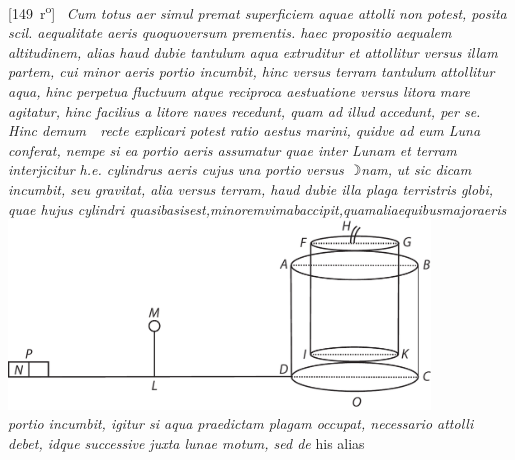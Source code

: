 [149~r\textsuperscript{o}]
\pend%
\count{}
\count{}
\pstart%
% 
%
%
% 
 \,
\textit{Cum totus aer simul premat superficiem aquae attolli non potest, posita scil. aequalitate aeris quoquoversum prementis.
haec propositio aequalem
altitudinem, alias
\textit{haud dubie tantulum aqua extruditur et attollitur versus illam partem, cui minor aeris portio incumbit, hinc versus terram tantulum}} \textit{attollitur aqua, hinc perpetua fluctuum atque reciproca aestuatione versus litora} \textit{mare agitatur, hinc facilius a litore naves recedunt, quam ad illud accedunt, per se.} \textit{Hinc demum\ }\ \textit{recte explicari potest ratio aestus marini, quidve ad eum Luna conferat, nempe si ea portio aeris assumatur quae inter Lunam\protect{} et terram\protect{} interjicitur h.e. cylindrus aeris cujus} \textit{una portio versus $\rightmoon$nam,} \textit{ut sic dicam} \textit{incumbit, seu gravitat, alia versus terram, haud dubie illa plaga terristris globi\protect{}, quae hujus cylindri quasi\hfill basis\hfill est,\hfill minorem\hfill vim\hfill ab\hfill {}accipit,\hfill quam\hfill aliae\hfill quibus\hfill major\hfill aeris} 
\pend 
\pstart
\centering
\includegraphics[width=0.84\textwidth]{images/LH035,14,02_150v-d2.pdf}\\
\pend
\vspace{1.5em}
\pstart \noindent \textit{portio incumbit, igitur si aqua praedictam plagam occupat, necessario attolli debet, idque successive juxta lunae motum\protect{}, sed de} his alias
